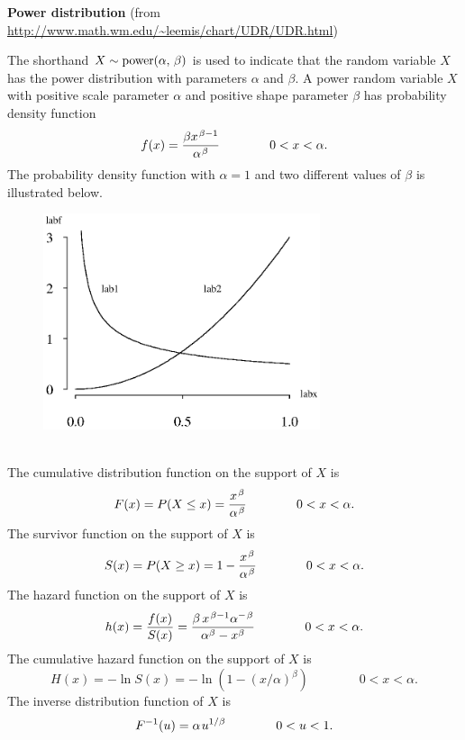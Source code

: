 \documentclass[12pt,fullpage]{article}
\begin{document}
\noindent
{\bf Power distribution} (from \color{blue}\url{http://www.math.wm.edu/~leemis/chart/UDR/UDR.html}\color{black})

\noindent
The shorthand $X \sim {\rm power}(\alpha,\, \beta)$ is used to indicate that the
random variable $X$ has the power distribution with parameters $\alpha$ and $\beta$.
A power random variable $X$ with positive scale parameter $\alpha$ and positive shape parameter $\beta$ has probability density function 
$$
f(x) = \frac{\beta x ^ {\kern 0.08 em \beta - 1}} {\alpha ^ {\kern 0.08 em \beta}} \qquad \qquad 0 < x < \alpha.
$$
The probability density function with $\alpha = 1$ and two different values of $\beta$ is illustrated below.
{\begin{figure}[h!]
\begin{center}
\includegraphics[width=3.2in]{PowerPlot.ps}
\end{center}
\end{figure}}\\
The cumulative distribution function on
the support of $X$ is
$$
F(x) = P(X \le x) = \frac{x ^ {\kern 0.08 em \beta}} {\alpha ^ {\kern 0.08 em \beta}}  \qquad \qquad 0 < x < \alpha.
$$
The survivor function on the support of $X$ is
$$
S(x) = P(X \ge x) = 1 - \frac{x ^ {\kern 0.08 em \beta}} {\alpha ^ {\kern 0.08 em \beta}}  \qquad \qquad 0 < x < \alpha.
$$
The hazard function on the support of $X$ is
$$
h(x) = \frac{f(x)} {S(x)} = \frac {{\beta} \, {x} ^ {{\kern 0.08 em \beta} - 1}{{ \alpha}} ^ {-{\kern 0.08 em \beta}}} {\alpha^{\beta} - x^{\beta}} \qquad \qquad 0 < x < \alpha.
$$
The cumulative hazard function on the support of $X$ is
$$
H(x) = - \ln S(x) = -\ln \left(1 - (x / \alpha) ^ {\beta} \right) \qquad \qquad 0 < x < \alpha.
$$
The inverse distribution function of $X$ is
$$
F ^ {-1}(u) = \alpha \kern 0.08 em u ^ {1 / \beta} \qquad \qquad 0 < u < 1.
$$
\end{document}
